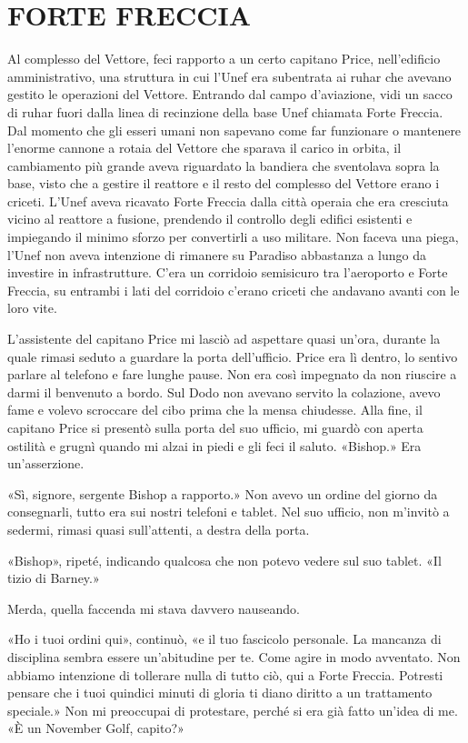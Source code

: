\chapter{FORTE FRECCIA}\label{forte-freccia}

Al complesso del Vettore, feci rapporto a un certo capitano Price,
nell'edificio amministrativo, una struttura in cui l'Unef era subentrata
ai ruhar che avevano gestito le operazioni del Vettore. Entrando dal
campo d'aviazione, vidi un sacco di ruhar fuori dalla linea di
recinzione della base Unef chiamata Forte Freccia. Dal momento che gli
esseri umani non sapevano come far funzionare o mantenere l'enorme
cannone a rotaia del Vettore che sparava il carico in orbita, il
cambiamento più grande aveva riguardato la bandiera che sventolava sopra
la base, visto che a gestire il reattore e il resto del complesso del
Vettore erano i criceti. L'Unef aveva ricavato Forte Freccia dalla città
operaia che era cresciuta vicino al reattore a fusione, prendendo il
controllo degli edifici esistenti e impiegando il minimo sforzo per
convertirli a uso militare. Non faceva una piega, l'Unef non aveva
intenzione di rimanere su Paradiso abbastanza a lungo da investire in
infrastrutture. C'era un corridoio semisicuro tra l'aeroporto e Forte
Freccia, su entrambi i lati del corridoio c'erano criceti che andavano
avanti con le loro vite.

L'assistente del capitano Price mi lasciò ad aspettare quasi un'ora,
durante la quale rimasi seduto a guardare la porta dell'ufficio. Price
era lì dentro, lo sentivo parlare al telefono e fare lunghe pause. Non
era così impegnato da non riuscire a darmi il benvenuto a bordo. Sul
Dodo non avevano servito la colazione, avevo fame e volevo scroccare del
cibo prima che la mensa chiudesse. Alla fine, il capitano Price si
presentò sulla porta del suo ufficio, mi guardò con aperta ostilità e
grugnì quando mi alzai in piedi e gli feci il saluto. «Bishop.» Era
un'asserzione.

«Sì, signore, sergente Bishop a rapporto.» Non avevo un ordine del
giorno da consegnarli, tutto era sui nostri telefoni e tablet. Nel suo
ufficio, non m'invitò a sedermi, rimasi quasi sull'attenti, a destra
della porta.

«Bishop», ripeté, indicando qualcosa che non potevo vedere sul suo
tablet. «Il tizio di Barney.»

Merda, quella faccenda mi stava davvero nauseando.

«Ho i tuoi ordini qui», continuò, «e il tuo fascicolo personale. La
mancanza di disciplina sembra essere un'abitudine per te. Come agire in
modo avventato. Non abbiamo intenzione di tollerare nulla di tutto ciò,
qui a Forte Freccia. Potresti pensare che i tuoi quindici minuti di
gloria ti diano diritto a un trattamento speciale.» Non mi preoccupai di
protestare, perché si era già fatto un'idea di me. «È un November Golf,
capito?»

